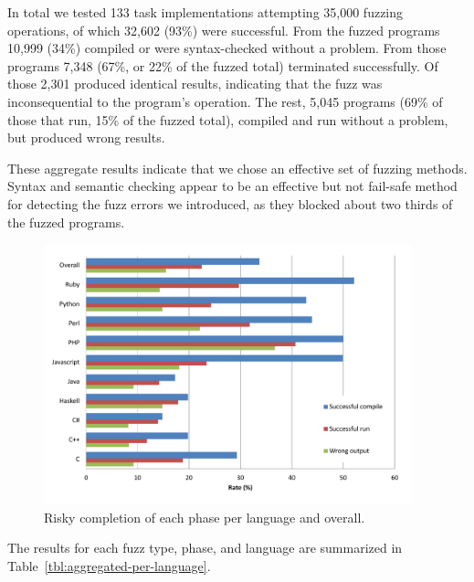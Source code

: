\documentclass[10pt]{sigplanconf}
\begin{document}
In total we tested
133 task implementations
attempting 35,000 fuzzing operations,
of which 32,602 (93\%) were successful.
From the fuzzed programs 10,999 (34\%)
compiled or were syntax-checked without a problem.
From those programs 7,348 (67\%, or 22\% of the fuzzed total) terminated successfully.
Of those 2,301 produced identical results, indicating that the fuzz was
inconsequential to the program's operation.
The rest, 5,045 programs (69\% of those that run, 15\% of the fuzzed total),
compiled and run without a problem, but produced wrong results.

These aggregate results indicate that we chose an effective set
of fuzzing methods.
Syntax and semantic checking appear to be an effective but not
fail-safe method for detecting the fuzz errors we introduced,
as they blocked about two thirds of the fuzzed programs.

\begin{figure}
        \begin{center}
                \includegraphics[width=0.95\textwidth]{chart}
        \end{center}
        \caption{Risky completion of each phase per language and overall.}
        \label{fig:results}
\end{figure}


The results for each fuzz type, phase, and language are summarized in
Table~\ref{tbl:aggregated-per-language}.
\end{document}
